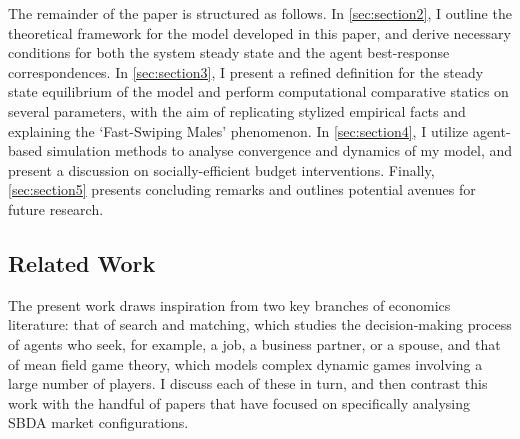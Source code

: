 The remainder of the paper is structured as follows. In \autoref{sec:section2}, I outline the theoretical framework for the model developed in this paper, and derive necessary conditions for both the system steady state and the agent best-response correspondences. In \autoref{sec:section3}, I present a refined definition for the steady state equilibrium of the model and perform computational comparative statics on several parameters, with the aim of replicating stylized empirical facts and explaining the `Fast-Swiping Males' phenomenon. In \autoref{sec:section4}, I utilize agent-based simulation methods to analyse convergence and dynamics of my model, and present a discussion on socially-efficient budget interventions. Finally, \autoref{sec:section5} presents concluding remarks and outlines potential avenues for future research.

\subsection{Related Work}
The present work draws inspiration from two key branches of economics literature: that of search and matching, which studies the decision-making process of agents who seek, for example, a job, a business partner, or a spouse, and that of mean field game theory, which models complex dynamic games involving a large number of players. I discuss each of these in turn, and then contrast this work with the handful of papers that have focused on specifically analysing SBDA market configurations.

